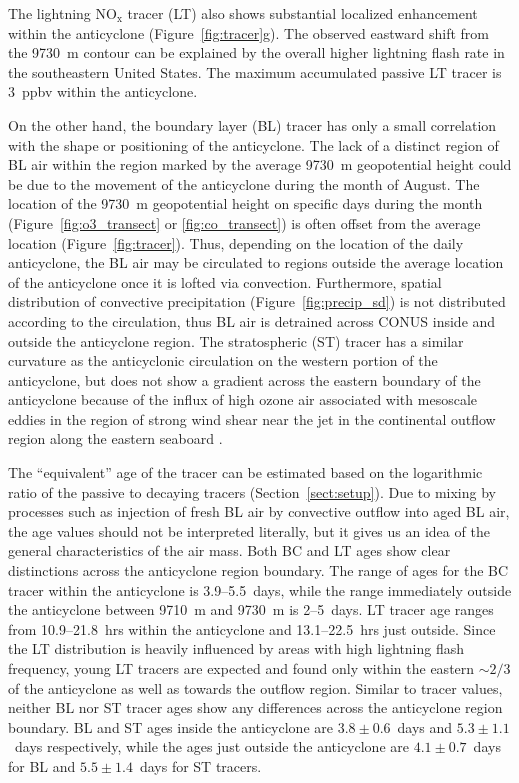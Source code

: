 The lightning NO$_{\mathrm{x}}$ tracer (LT) also shows substantial localized
enhancement within the anticyclone (Figure~\ref{fig:tracer}g). The observed eastward
shift from the 9730~m contour can be explained by the overall higher lightning
flash rate in the southeastern United States. The maximum accumulated passive
LT tracer is 3~ppbv within the anticyclone.

On the other hand, the boundary layer (BL) tracer has only a small correlation with the shape or positioning of the anticyclone.
The lack of a distinct region of BL air within the region marked by the average 9730~m geopotential height could be
due to the movement of the anticyclone during the month of August. The location of the 9730~m geopotential height on
specific days during the month (Figure~\ref{fig:o3_transect} or \ref{fig:co_transect}) is often offset from the average location
(Figure~\ref{fig:tracer}). Thus, depending on the location of the daily anticyclone, the BL air may be circulated to regions
outside the average location of the anticyclone once it is lofted via convection. Furthermore, spatial distribution of
convective precipitation (Figure~\ref{fig:precip_sd}) is not distributed according to the circulation, thus BL air is detrained
across CONUS inside and outside the anticyclone region. The stratospheric (ST) tracer has a similar
curvature as the anticyclonic circulation on the western portion of the anticyclone, but does not show a gradient across
the eastern boundary of the anticyclone because of the influx of high ozone air associated with mesoscale eddies in the region
of strong wind shear near the jet in the continental outflow region along the eastern seaboard \citep[see][]{Konopka:2010fk}.

The ``equivalent'' age of the tracer can be estimated based on the logarithmic ratio of the passive to decaying tracers (Section~\ref{sect:setup}).
Due to mixing by processes such as injection of fresh BL air by convective outflow into aged BL air,
the age values should not be interpreted literally, but it gives us an idea of the general characteristics of the air mass.
Both BC and LT ages show clear distinctions
across the anticyclone region boundary. The range of ages for the BC tracer within
the anticyclone is 3.9--5.5~days, while the range immediately outside the anticyclone
between 9710~m and 9730~m is 2--5~days. LT tracer age ranges from 10.9--21.8~hrs
within the anticyclone and 13.1--22.5~hrs just outside. Since the LT distribution is
heavily influenced by areas with high lightning flash frequency, young LT tracers
are expected and found  only within the eastern $\sim2/3$ of the anticyclone as
well as towards the outflow region. Similar to tracer values, neither BL nor ST tracer ages show
any differences across the anticyclone region boundary. BL and ST ages inside
the anticyclone are $3.8\pm0.6$~days and $5.3\pm1.1$~days respectively, while
the ages just outside the anticyclone are $4.1\pm0.7$~days for BL and $5.5\pm1.4$~days for ST tracers.

